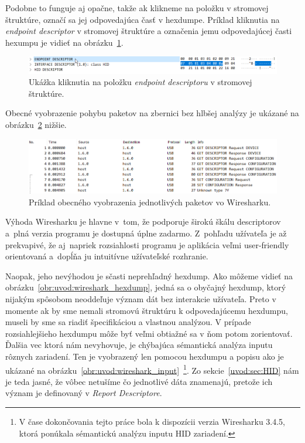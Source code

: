 Podobne to funguje aj opačne, takže ak klikneme na položku v stromovej štruktúre, označí sa jej odpovedajúca časť v hexdumpe. Príklad kliknutia na \textit{endpoint descriptor} v stromovej štruktúre a označenia jemu odpovedajúcej časti hexumpu je vidieť na obrázku~\ref{obr:uvod:tree_click}.

\begin{figure}[!htb]
	\centering
	\includegraphics[width=\textwidth]{img/uvod_wireshark_tree_click}
	\caption{Ukážka kliknutia na položku \textit{endpoint descriptoru} v stromovej štruktúre.}
	\label{obr:uvod:tree_click}
\end{figure}

Obecné vyobrazenie pohybu paketov na zbernici bez hlbšej analýzy je ukázané na obrázku~\ref{obr:uvod:wireshark_listview} nižšie.

\begin{figure}[!htb]
	\centering
	\includegraphics[width=\textwidth]{img/uvod_wireshark_listview}
	\caption{Príklad obecného vyobrazenia jednotlivých paketov vo Wiresharku.}
	\label{obr:uvod:wireshark_listview}
\end{figure}

Výhoda Wiresharku je hlavne v~tom, že podporuje širokú škálu descriptorov a~plná verzia programu je dostupná úplne zadarmo. Z~pohľadu užívateľa je až prekvapivé, že aj~napriek rozsiahlosti programu je aplikácia veľmi user-friendly orientovaná a~dopĺňa ju intuitívne užívateľské rozhranie.

Naopak, jeho nevýhodou je sčasti neprehľadný hexdump. Ako môžeme vidieť na obrázku~\ref{obr:uvod:wireshark_hexdump}, jedná sa o obyčajný hexdump, ktorý nijakým spôsobom neoddeľuje význam dát bez interakcie užívateľa. Preto v momente ak by sme nemali stromovú štruktúru k odpovedajúcemu hexdumpu, museli by sme sa riadiť špecifikáciou a vlastnou analýzou. V prípade rozsiahlejšieho hexdumpu môže byť veľmi obtiažné sa v ňom potom zorientovať. Ďalšia vec ktorá nám nevyhovuje, je chýbajúca sémantická analýza inputu rôznych zariadení. Ten je vyobrazený len pomocou hexdumpu a popisu  ako je ukázané na obrázku~\ref{obr:uvod:wireshark_input}~\footnote{V čase dokončovania tejto práce bola k dispozícii verzia Wiresharku 3.4.5, ktorá ponúkala sémantickú analýzu inputu HID zariadení.}. Zo sekcie~\ref{uvod:sec:HID} nám je teda jasné, že vôbec netušíme čo jednotlivé dáta znamenajú, pretože ich význam je definovaný v \textit{Report Descriptore}.

